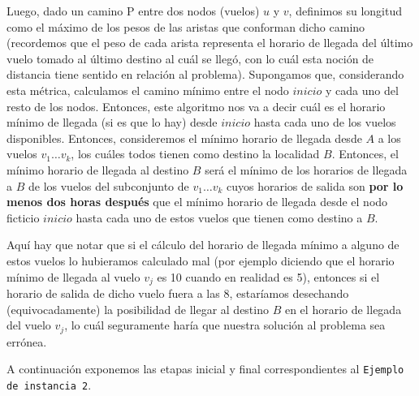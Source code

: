 \documentclass[11pt, a4paper, twoside]{article}
\begin{document}
\par Luego, dado un camino P entre dos nodos (vuelos) $u$ y $v$, definimos su longitud como
el máximo de los pesos de las aristas que conforman dicho camino (recordemos que el peso de cada
arista representa el horario de llegada del último vuelo tomado al último destino al cuál se
llegó, con lo cuál esta noción de distancia tiene sentido en relación al problema). 
Supongamos que, considerando 
esta métrica, calculamos el camino mínimo entre el nodo $inicio$ y cada uno del resto de los nodos.
Entonces, este algoritmo nos va a decir cuál es el horario mínimo de llegada (si es que lo hay) 
desde $inicio$ hasta cada uno de los vuelos disponibles. Entonces, consideremos el mínimo
horario de llegada desde $A$ a los vuelos $v_{1} \dots v_{k}$, los cuáles todos tienen como destino la 
localidad $B$. Entonces, el mínimo horario de llegada al destino $B$ será el mínimo de los horarios
de llegada a $B$ de los vuelos del subconjunto de $v_{1} \dots v_{k}$ cuyos horarios de salida son 
\textbf{por lo menos dos horas después} que el mínimo horario de llegada desde el nodo ficticio
$inicio$ hasta cada uno de estos vuelos que tienen como destino a $B$.

\par Aquí hay que notar que si el cálculo del horario de llegada mínimo a
alguno de estos vuelos lo hubieramos calculado mal (por ejemplo diciendo que el horario mínimo de
llegada al vuelo $v_{j}$ es 10 cuando en realidad es 5), entonces si el horario de salida de dicho vuelo
fuera a las 8, estaríamos desechando (equivocadamente) la posibilidad de llegar al destino $B$ en el 
horario de llegada del vuelo $v_{j}$, lo cuál seguramente haría que nuestra solución al problema
sea errónea.

\par A continuación exponemos las etapas inicial y final correspondientes al \texttt{Ejemplo de 
instancia 2}.
\end{document}
